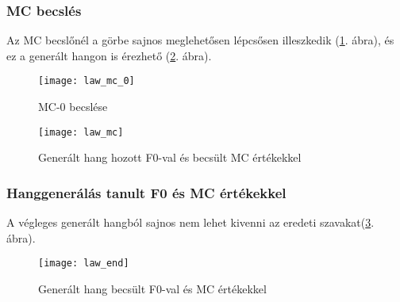 \clearpage
\subsubsection{MC becslés}
Az MC becslőnél a görbe sajnos meglehetősen lépcsősen illeszkedik (\ref{law-6}. ábra), és ez a generált hangon is érezhető (\ref{law-7}. ábra).
\begin{figure}[h]
	\par\centering	
	\texttt{[image: law\_mc\_0]}
	\caption{MC-0 becslése}
	\label{law-6}
\end{figure}
\begin{figure}[h]
	\par\centering	
	\texttt{[image: law\_mc]}
	\caption{Generált hang hozott F0-val és becsült MC értékekkel}
	\label{law-7}
\end{figure}
\subsubsection{Hanggenerálás tanult F0 és MC értékekkel}
A végleges generált hangból sajnos nem lehet kivenni az eredeti szavakat(\ref{law-8}. ábra).
\begin{figure}[h]
	\par\centering	
	\texttt{[image: law\_end]}
	\caption{Generált hang becsült F0-val és MC értékekkel}
	\label{law-8}
\end{figure}
